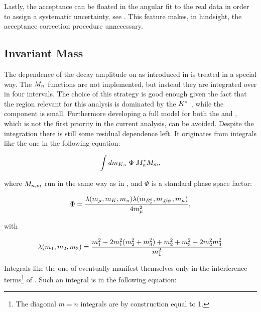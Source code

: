 Lastly, the acceptance can be floated in the angular fit to the real data in order to assign a systematic uncertainty, see .
This feature makes, in hindsight, the acceptance correction procedure unnecessary.


\subsection{\Kpi Invariant Mass}
\label{Kpi_Invariant_mass}

The dependence of the \BJpsiKpi decay amplitude on \mkpi as introduced in  is treated in a special way.
The $\mKpiAmp$ functions are not implemented, but instead they are integrated over in four intervals. The choice of this strategy
is good enough given the fact that the \mkpi region relevant for this analysis is dominated by the $\Kstar$ \pwave,
while the \swave component is small. Furthermore developing a full model for both the \pwave and \swave, which is not the
first priority in the current analysis, can be avoided. Despite the \mkpi integration there is still some residual dependence left.
It originates from integrals like the one in the following equation:

\begin{equation}
  \label{spIntegrals}
  \int d\mkpi \; \Phi \; \mKpiAmp^* \mKpiAmp[m],
\end{equation}

\noindent where $\mKpiAmp[n,m]$ run in the same way as in , and $\Phi$ is a standard
phase space factor:

\begin{equation}
  \centering
  \Phi = \frac{\lambda(m_\mmu,m_\kaon,m_\pion) \lambda(m_{\Bs},m_\jpsi,m_\mmu)}{ 4 m_\mmu^2},
  \label{csp_ph_sp_factor}
\end{equation}

\noindent with

\begin{equation}
  \centering
  \lambda(m_1,m_2,m_3) = \frac{m_1^2 - 2m_1^2(m_2^2 + m_3^2) + m_2^2 + m_3^2 - 2m_2^2m_3^2 } {m_1^2} \nonumber
  \label{csp_ph_sp_factor_def}
\end{equation}

Integrals like the one of  eventually manifest themselves only in the \spwave interference
terms\footnote{The diagonal $m=n$ integrals are by construction equal to 1.} of .
Such an integral is in the following equation:

